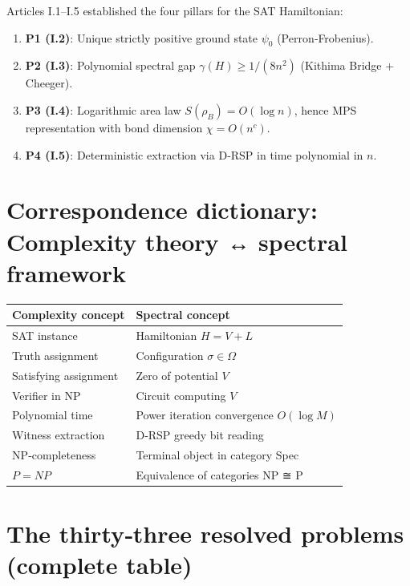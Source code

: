 \documentclass[11pt,a4paper]{article}
\begin{document}
Articles I.1–I.5 established the four pillars for the SAT Hamiltonian:

\begin{enumerate}
\item \textbf{P1 (I.2)}: Unique strictly positive ground state \(\psi_0\) (Perron‑Frobenius).
\item \textbf{P2 (I.3)}: Polynomial spectral gap \(\gamma(H) \ge 1/(8n^2)\) (Kithima Bridge + Cheeger).
\item \textbf{P3 (I.4)}: Logarithmic area law \(S(\rho_B) = O(\log n)\), hence MPS representation with bond dimension \(\chi = O(n^c)\).
\item \textbf{P4 (I.5)}: Deterministic extraction via D‑RSP in time polynomial in \(n\).
\end{enumerate}

\section{Correspondence dictionary: Complexity theory ↔ spectral framework}

\begin{center}
\begin{tabular}{@{}l|l@{}}
\toprule
\textbf{Complexity concept} & \textbf{Spectral concept} \\
\midrule
SAT instance & Hamiltonian \(H = V + L\) \\
Truth assignment & Configuration \(\sigma \in \Omega\) \\
Satisfying assignment & Zero of potential \(V\) \\
Verifier in NP & Circuit computing \(V\) \\
Polynomial time & Power iteration convergence \(O(\log M)\) \\
Witness extraction & D‑RSP greedy bit reading \\
NP‑completeness & Terminal object in category Spec \\
\(P = NP\) & Equivalence of categories NP ≅ P \\
\bottomrule
\end{tabular}
\end{center}

\section{The thirty‑three resolved problems (complete table)}
\end{document}
